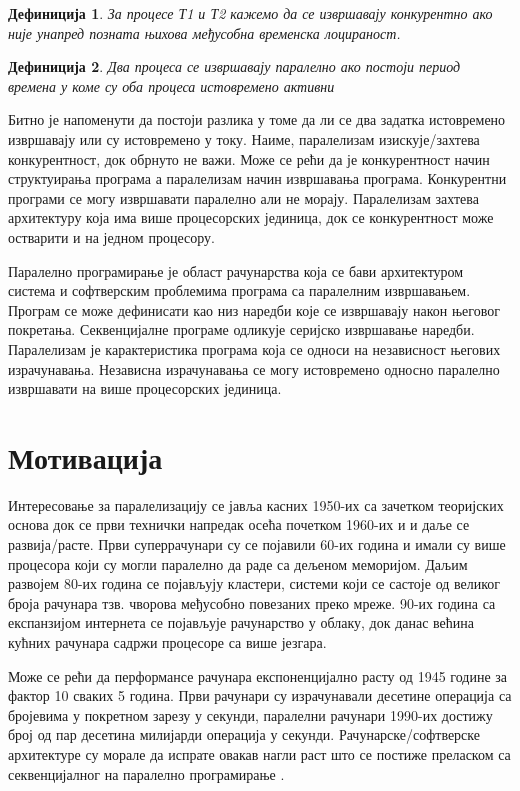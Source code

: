 \documentclass[12pt,oneside]{memoir}
\newtheorem{definic}{Дефиниција}
\begin{document}
\begin{definic}
	За процесе Т1 и Т2 кажемо да се извршавају конкурентно ако није унапред позната њихова међусобна временска лоцираност.
\end{definic}
\begin{definic}
	Два процеса се извршавају паралелно ако постоји период времена у коме су оба процеса истовремено активни
\end{definic}

Битно је напоменути да постоји разлика у томе да ли се два задатка истовремено извршавају или су истовремено у току. Наиме, паралелизам изискује/захтева конкурентност, док обрнуто не важи. Може се рећи да је конкурентност начин структуирања програма а паралелизам начин извршавања програма. Конкурентни програми се могу извршавати паралелно али не морају. Паралелизам захтева архитектуру која има више процесорских јединица, док се конкурентност може остварити и на једном процесору.

 	Паралелно програмирање је област рачунарства која се бави архитектуром система и софтверским проблемима програма са паралелним извршавањем. Програм се може дефинисати као низ наредби које се извршавају након његовог покретања. Секвенцијалне програме одликује серијско извршавање наредби. Паралелизам је карактеристика програма која се односи на независност његових израчунавања. Независна израчунавања се могу истовремено односно паралелно извршавати на више процесорских јединица.
  \section{Мотивација}
  Интересовање за паралелизацију се јавља касних 1950-их са зачетком теоријских основа док се први технички напредак осећа почетком 1960-их и и даље се развија/расте. Први суперрачунари су се појавили 60-их година и имали су више процесора који су могли паралелно да раде са дељеном меморијом. Даљим развојем 80-их година се појављују кластери, системи који се састоје од великог броја рачунара тзв. чворова међусобно повезаних преко мреже. 90-их година са експанзијом интернета се појављује рачунарство у облаку, док данас већина кућних рачунара садржи процесоре са више језгара. 
  
   Може се рећи да перформансе рачунара експоненцијално расту од 1945 године за фактор 10 сваких 5 година. Први рачунари су израчунавали десетине операција са бројевима у покретном зарезу у секунди, паралелни рачунари 1990-их достижу број од пар десетина милијарди операција у секунди. Рачунарске/софтверске архитектуре су морале да испрате овакав нагли раст што се постиже преласком са секвенцијалног на паралелно програмирање \cite{par_history}.
   
\end{document}
